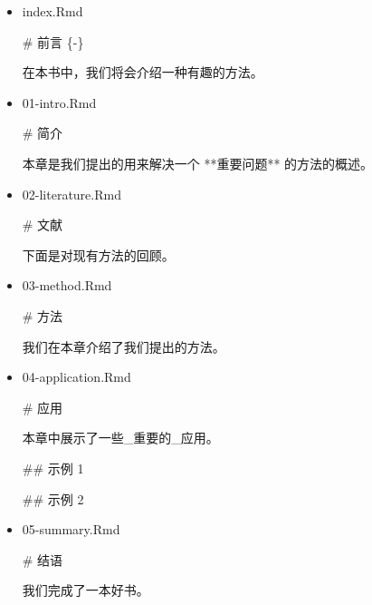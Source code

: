 \documentclass[
  12pt,
]{krantz}
\newenvironment{Shaded}{\begin{snugshade}}{\end{snugshade}}
\newcommand{\FunctionTok}[1]{\textcolor[rgb]{0.00,0.00,0.00}{#1}}
\newcommand{\NormalTok}[1]{#1}
\theoremstyle{definition}
\theoremstyle{definition}
\theoremstyle{definition}
\theoremstyle{definition}
\theoremstyle{remark}
\begin{document}
\begin{itemize}
\item
  index.Rmd

\begin{Shaded}
\begin{Highlighting}[]
\FunctionTok{\# 前言 \{{-}\}}

\NormalTok{在本书中，我们将会介绍一种有趣的方法。}
\end{Highlighting}
\end{Shaded}
\item
  01-intro.Rmd

\begin{Shaded}
\begin{Highlighting}[]
\FunctionTok{\# 简介}

\NormalTok{本章是我们提出的用来解决一个 **重要问题** 的方法的概述。}
\end{Highlighting}
\end{Shaded}
\item
  02-literature.Rmd

\begin{Shaded}
\begin{Highlighting}[]
\FunctionTok{\# 文献}

\NormalTok{下面是对现有方法的回顾。}
\end{Highlighting}
\end{Shaded}
\item
  03-method.Rmd

\begin{Shaded}
\begin{Highlighting}[]
\FunctionTok{\# 方法}

\NormalTok{我们在本章介绍了我们提出的方法。}
\end{Highlighting}
\end{Shaded}
\item
  04-application.Rmd

\begin{Shaded}
\begin{Highlighting}[]
\FunctionTok{\# 应用}

\NormalTok{本章中展示了一些\_重要的\_应用。}

\FunctionTok{\#\# 示例 1}

\FunctionTok{\#\# 示例 2}
\end{Highlighting}
\end{Shaded}
\item
  05-summary.Rmd

\begin{Shaded}
\begin{Highlighting}[]
\FunctionTok{\# 结语}

\NormalTok{我们完成了一本好书。}
\end{Highlighting}
\end{Shaded}
\end{itemize}
\end{document}
